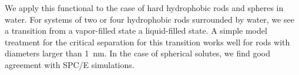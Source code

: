 \documentclass[letterpaper,twocolumn,amsmath,amssymb,prb]{revtex4-1}
\begin{document}
We apply this functional to the case of hard hydrophobic rods and
spheres in water.  For systems of two or four hydrophobic rods
surrounded by water, we see a transition from a vapor-filled state a
liquid-filled state.  A simple model treatment for the critical
separation for this transition works well for rods with diameters
larger than 1~nm.  In the case of spherical solutes, we find good
agreement with SPC/E simulations.

\end{document}
